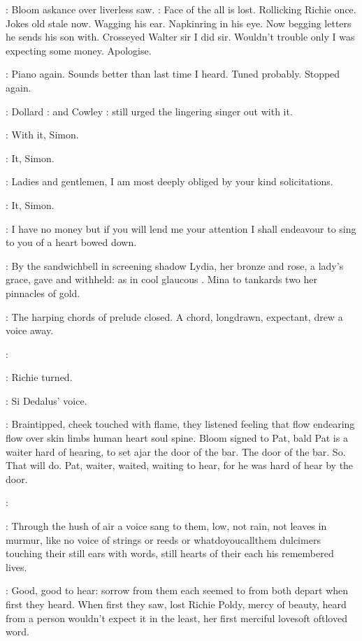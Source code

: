 :
Bloom askance over liverless saw.
\BloomInt:
Face of the all is lost. Rollicking
Richie once. Jokes old stale now. Wagging his ear. Napkinring in his eye.
Now begging letters he sends his son with. Crosseyed Walter sir I did sir.
Wouldn't trouble only I was expecting some money. Apologise.

\BloomInt:
Piano again.
Sounds better than last time I heard. Tuned probably.
Stopped again.

:
Dollard
:
and Cowley
:
still urged the lingering singer out with it.

\dollard:
With it, Simon.

\cowley:
It, Simon.

\simon:
Ladies and gentlemen, I am most deeply obliged by your kind
solicitations.

\cowley:
It, Simon.

\simon:
I have no money but if you will lend me your attention I shall endeavour
to sing to you of a heart bowed down.

:
By the sandwichbell
in screening shadow Lydia, her bronze and rose,
a lady's grace, gave and withheld: as in cool glaucous
.
Mina to tankards two her pinnacles of gold.

:
The harping chords of prelude closed. A chord, longdrawn, expectant,
drew a voice away.

\simon:

:
Richie turned.

\goulding:
Si Dedalus' voice.

:
Braintipped, cheek touched with flame, they listened feeling that flow
endearing flow over skin limbs human heart soul spine. Bloom signed to
Pat, bald Pat is a waiter hard of hearing,
to set ajar the door of the
bar. The door of the bar. So. That will do. Pat, waiter, waited, waiting
to hear, for he was hard of hear by the door.

\simon:

:
Through the hush of air a voice sang to them, low, not rain, not leaves
in murmur, like no voice of strings or reeds or whatdoyoucallthem
dulcimers touching their still ears with words, still hearts of their each
his remembered lives.

\BloomInt:
Good, good to hear: sorrow from them each seemed to
from both depart when first they heard. When first they saw, lost Richie
Poldy, mercy of beauty, heard from a person wouldn't expect it in the least,
her first merciful
lovesoft oftloved word.

